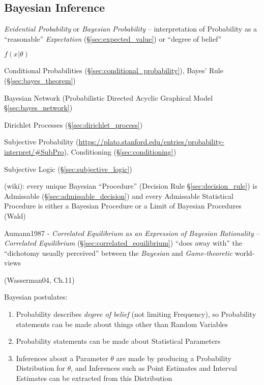 \subsection{Bayesian Inference}\label{sec:bayesian_inference}

\emph{Evidential Probability} or \emph{Bayesian Probability} -- interpretation
of Probability as a ``reasonable'' \emph{Expectation}
(\S\ref{sec:expected_value}) or ``degree of belief''

$f(x | \theta)$

Conditional Probabilities (\S\ref{sec:conditional_probability}), Bayes' Rule
(\S\ref{sec:bayes_theorem})

\fist Bayesian Network (Probabilistic Directed Acyclic Graphical Model
\S\ref{sec:bayes_network})

\fist Dirichlet Processes (\S\ref{sec:dirichlet_process})

Subjective Probability %
(\url{https://plato.stanford.edu/entries/probability-interpret/#SubPro}),
Conditioning (\S\ref{sec:conditioning})

\fist Subjective Logic (\S\ref{sec:subjective_logic})

(wiki): every unique Bayesian ``Procedure'' (Decision Rule
\S\ref{sec:decision_rule}) is Admissable (\S\ref{sec:admissable_decision}) and
every Admissable Statistical Procedure is either a Bayesian Procedure or a Limit
of Bayesian Procedures (Wald)

\fist Aumann1987 - \emph{Correlated Equilibrium as an Expression of Bayesian
  Rationality} -- \emph{Correlated Equilibrium}
(\S\ref{sec:correlated_equilibrium}) ``does away with'' the ``dichotomy usually
perceived'' between the \emph{Bayesian} and \emph{Game-theoretic} world-views

(Wasserman04, Ch.11)

Bayesian postulates:
\begin{enumerate}
  \item Probability describes \emph{degree of belief} (not limiting Frequency),
    so Probability statements can be made about things other than Random
    Variables
  \item Probability statements can be made about Statistical Parameters
  \item Inferences about a Parameter $\theta$ are made by producing a
    Probability Distribution for $\theta$, and Inferences such as Point
    Estimates and Interval Estimates can be extracted from this Distribution
\end{enumerate}


